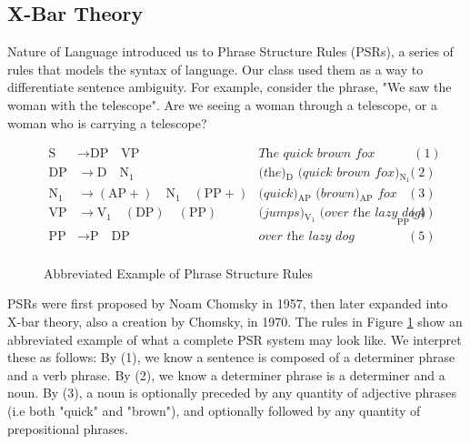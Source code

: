 \documentclass[runningheads]{llncs}
\begin{document}
\subsection{X-Bar Theory}
Nature of Language introduced us to Phrase Structure Rules (PSRs), a series of rules that models the syntax of language. Our class used them as a way to differentiate sentence ambiguity. %
For example, consider the phrase, "We saw the woman with the telescope". Are we seeing a woman through a telescope, or a woman who is carrying a telescope?

\begin{figure}
    \[
			\begin{array}{rlrr}
				\text{S}  &\rightarrow \text{DP} \quad \text{VP}&\textit{The quick brown fox jumps over the lazy dog} &\ \ (1) \\
				\text{DP}  &\rightarrow \text{D} \quad \text{N}_1&\textit{(the)$_\text{D}$ (quick brown fox)$_{\text{N}_1}$} & (2) \\
				\text{N}_1 &\rightarrow (\text{AP}+) \quad \text{N}_1 \quad (\text{PP}+)&\textit{(quick)$_\text{AP}$ (brown)$_\text{AP}$ fox} & (3)\\
				\text{VP} &\rightarrow \text{V}_1 \quad (\text{DP}) \quad (\text{PP})&\textit{(jumps)$_{\text{V}_1}$ (over the lazy dog)}_{\text{PP}} & (4)\\
				\text{PP} &\rightarrow \text{P} \quad \text{DP}&\textit{over the lazy dog} & (5)\\
    \end{array}
	\]
    \caption{Abbreviated Example of Phrase Structure Rules}
		\label{fig:psr}
\end{figure}
PSRs were first proposed by Noam Chomsky in 1957, then later expanded into X-bar theory, also a creation by Chomsky, in 1970.\cite{chomsky1957}\cite{chomsky1970}
The rules in Figure \ref{fig:psr} show an abbreviated example of what a complete PSR system may look like. We interpret these as follows: By (1), we know a sentence is composed of a determiner phrase and a verb phrase. By (2), we know a determiner phrase is a determiner and a noun. By (3), a noun is optionally preceded by any quantity of adjective phrases (i.e both "quick" and "brown"), and optionally followed by any quantity of prepositional phrases.
\end{document}

